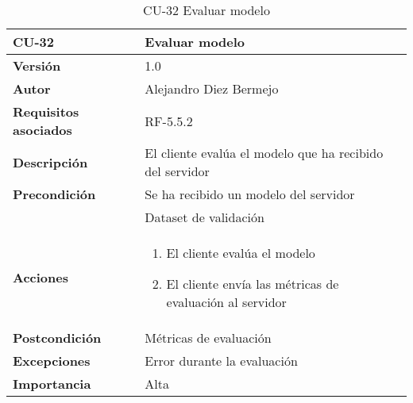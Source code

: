 \begin{table}[p]
	\centering
	\begin{tabularx}{\linewidth}{ p{} p{} }
		\toprule
		\textbf{CU-32}    & \textbf{Evaluar modelo}\\
		\toprule
		\textbf{Versión}              & 1.0    \\
		\textbf{Autor}                & Alejandro Diez Bermejo \\
		\textbf{Requisitos asociados} & RF-5.5.2 \\
		\textbf{Descripción}          & El cliente evalúa el modelo que ha recibido del servidor \\
        \textbf{Precondición}         & Se ha recibido un modelo del servidor \\
                                      & Dataset de validación \\
		\textbf{Acciones}             &
		\begin{enumerate}
			\def\labelenumi{\arabic{enumi}.}
			\tightlist
            \item El cliente evalúa el modelo
            \item El cliente envía las métricas de evaluación al servidor
		\end{enumerate}\\
		\textbf{Postcondición}        & Métricas de evaluación \\
		\textbf{Excepciones}          & Error durante la evaluación \\
		\textbf{Importancia}          & Alta \\
		\bottomrule
	\end{tabularx}
	\caption{CU-32 Evaluar modelo}
\end{table}

